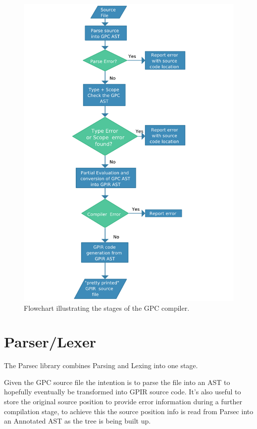 \begin{figure}[!htb]
\begin{center}
\includegraphics[scale=0.55]{graphs/Dissertation.pdf}
\caption{Flowchart illustrating the stages of the GPC compiler.}
\end{center}
\end{figure}

    
\section{Parser/Lexer}
The Parsec library combines Parsing and Lexing into one stage.

Given the GPC source file the intention is to parse the file into an AST
to hopefully eventually be transformed into GPIR source code. It's
also useful to store the original source position to provide error information 
during a further compilation stage, to achieve this the source position
info is read from Parsec into an Annotated AST as the tree is being built up.

